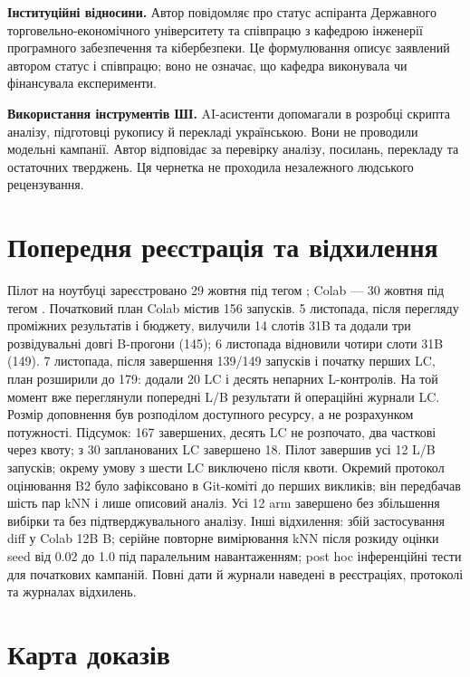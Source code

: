 \documentclass[11pt]{article}
\begin{document}
\textbf{Інституційні відносини.} Автор повідомляє про статус аспіранта Державного торговельно-економічного університету та співпрацю з кафедрою інженерії програмного забезпечення та кібербезпеки. Це формулювання описує заявлений автором статус і співпрацю; воно не означає, що кафедра виконувала чи фінансувала експерименти.

\textbf{Використання інструментів ШІ.} AI-асистенти допомагали в розробці скрипта аналізу, підготовці рукопису й перекладі українською. Вони не проводили модельні кампанії. Автор відповідає за перевірку аналізу, посилань, перекладу та остаточних тверджень. Ця чернетка не проходила незалежного людського рецензування.




\clearpage
\appendix
\section{Попередня реєстрація та відхилення}\label{app:registration}

Пілот на ноутбуці зареєстровано 29 жовтня під тегом ; Colab — 30 жовтня під тегом . Початковий план Colab містив 156 запусків. 5 листопада, після перегляду проміжних результатів і бюджету, вилучили 14 слотів 31B та додали три розвідувальні довгі B-прогони (145); 6 листопада відновили чотири слоти 31B (149). 7 листопада, після завершення 139/149 запусків і початку перших LC, план розширили до 179: додали 20 LC і десять непарних L-контролів. На той момент вже переглянули попередні L/B результати й операційні журнали LC. Розмір доповнення був розподілом доступного ресурсу, а не розрахунком потужності. Підсумок: 167 завершених, десять LC не розпочато, два часткові через квоту; з 30 запланованих LC завершено 18. Пілот завершив усі 12 L/B запусків; окрему умову з шести LC виключено після квоти. Окремий протокол оцінювання B2 було зафіксовано в Git-коміті  до перших викликів; він передбачав шість пар kNN і лише описовий аналіз. Усі 12 arm завершено без збільшення вибірки та без підтверджувального аналізу. Інші відхилення: збій застосування diff у Colab 12B B; серійне повторне вимірювання kNN після розкиду оцінки seed від 0.02 до 1.0 під паралельним навантаженням; post hoc інференційні тести для початкових кампаній. Повні дати й журнали наведені в реєстраціях, протоколі та журналах відхилень.

\section{Карта доказів}\label{app:evidence}
\end{document}
